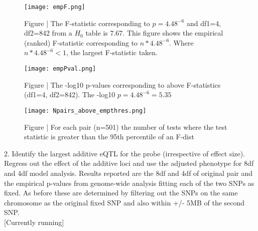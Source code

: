 \documentclass[paper=a4, fontsize=11pt]{scrartcl}					%
\numberwithin{equation}{section}									%
\numberwithin{figure}{section}										%
\numberwithin{table}{section}										%
\begin{document}
\newpage

\begin{figure}[H]
\centering
\texttt{[image: empF.png]}
\caption*{Figure | The F-statistic corresponding to $p=4.48^{-6}$ and df1=4, df2=842 from a $H_0$ table is 7.67. This figure shows the empirical (ranked) F-statistic corresponding to $n * 4.48^{-6}$. Where $n * 4.48^{-6} < 1$, the largest F-statistic taken.}
\end{figure}


\begin{figure}[H]
\centering
\texttt{[image: empPval.png]}
\caption*{Figure | The -log10 p-values corresponding to above F-statistics (df1=4, df2=842). The -log10 $p=4.48^{-6} = 5.35$}
\end{figure}



\newpage

\begin{figure}[H]
\centering
\texttt{[image: Npairs\_above\_empthres.png]}
\caption*{Figure | For each pair (n=501) the number of tests where the test statistic is greater than the 95th percentile of an F-dist}
\end{figure}




\newpage

2. Identify the largest additive eQTL for the probe (irrespective of effect size). Regress out the effect of the additive loci and use the adjusted phenotype for 8df and 4df model analysis. Results reported are the 8df and 4df of original pair and the empirical p-values from genome-wide analysis fitting each of the two SNPs as fixed. As before these are determined by filtering out the SNPs on the same chromosome as the original fixed SNP and also within +/- 5MB of the second SNP. \\

[Currently running]
\end{document}

